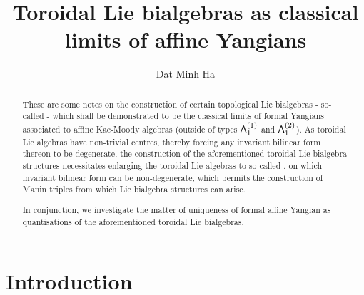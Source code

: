 

\setcounter{section}{-1}





    \title{Toroidal Lie bialgebras as classical limits of affine Yangians}
    
    \author{Dat Minh Ha}
    \maketitle
    
    \begin{abstract}
        These are some notes on the construction of certain topological Lie bialgebras - so-called  - which shall be demonstrated to be the classical limits of formal Yangians associated to affine Kac-Moody algebras (outside of types $\mathsf{A}_1^{(1)}$ and $\mathsf{A}_1^{(2)}$). As toroidal Lie algebras have non-trivial centres, thereby forcing any invariant bilinear form thereon to be degenerate, the construction of the aforementioned toroidal Lie bialgebra structures necessitates enlarging the toroidal Lie algebras to so-called , on which invariant bilinear form can be non-degenerate, which permits the construction of Manin triples from which Lie bialgebra structures can arise.

        In conjunction, we investigate the matter of uniqueness of formal affine Yangian as quantisations of the aforementioned toroidal Lie bialgebras. 
    \end{abstract}
    
    {
    \hypersetup{} 
    \tableofcontents %
    \listoftodos
    }

    \section{Introduction}

    

    

    

    
    \begin{appendices}
        
    \end{appendices}
            
    \printbibliography

